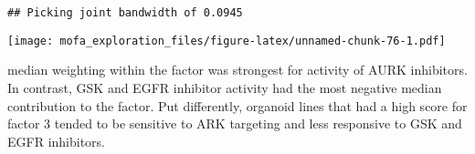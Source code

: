 \documentclass[
]{article}
\newenvironment{Shaded}{\begin{snugshade}}{\end{snugshade}}
\newcommand{\CommentTok}[1]{\textcolor[rgb]{0.56,0.35,0.01}{\textit{#1}}}
\newcommand{\DataTypeTok}[1]{\textcolor[rgb]{0.13,0.29,0.53}{#1}}
\newcommand{\DecValTok}[1]{\textcolor[rgb]{0.00,0.00,0.81}{#1}}
\newcommand{\KeywordTok}[1]{\textcolor[rgb]{0.13,0.29,0.53}{\textbf{#1}}}
\newcommand{\NormalTok}[1]{#1}
\newcommand{\OperatorTok}[1]{\textcolor[rgb]{0.81,0.36,0.00}{\textbf{#1}}}
\newcommand{\StringTok}[1]{\textcolor[rgb]{0.31,0.60,0.02}{#1}}
\begin{document}
\begin{Shaded}
\end{Shaded}

\begin{verbatim}
## Picking joint bandwidth of 0.0945
\end{verbatim}

\texttt{[image: mofa\_exploration\_files/figure-latex/unnamed-chunk-76-1.pdf]}

median weighting within the factor was strongest for activity of AURK
inhibitors. In contrast, GSK and EGFR inhibitor activity had the most
negative median contribution to the factor. Put differently, organoid
lines that had a high score for factor 3 tended to be sensitive to ARK
targeting and less responsive to GSK and EGFR inhibitors.
\end{document}
